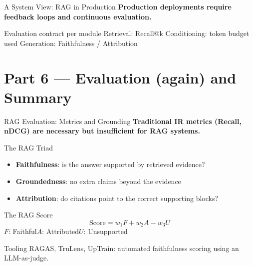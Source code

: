 \documentclass[aspectratio=169, xcolor=table]{beamer}
\newif\ifanimated
\newcommand{\cpause}{\ifanimated\pause\fi}
\begin{document}
\begin{frame}{A System View: RAG in Production}
\textbf{Production deployments require feedback loops and continuous evaluation.}

\vspace{0.5em}
\begin{center}
\resizebox{0.82\textwidth}{!}{

}
\end{center}

\cpause
\vspace{0.3em}
\begin{block}{Evaluation contract per module}
\footnotesize
Retrieval: Recall@k \quad\textbar\quad Conditioning: token budget used \quad\textbar\quad Generation: Faithfulness / Attribution
\end{block}
\end{frame}

\section{Part 6 --- Evaluation (again) and Summary}

\begin{frame}[plain]
\sectionpage
\end{frame}

\begin{frame}[shrink=10]{RAG Evaluation: Metrics and Grounding}
\textbf{Traditional IR metrics (Recall, nDCG) are necessary but insufficient for RAG systems.}

\vspace{0.8em}
\begin{block}{The RAG Triad}
\begin{itemize}
  \item \textbf{Faithfulness}: is the answer supported by retrieved evidence?
  \item \textbf{Groundedness}: no extra claims beyond the evidence
  \item \textbf{Attribution}: do citations point to the correct supporting blocks?
\end{itemize}
\end{block}

\cpause
\begin{block}{The RAG Score}
\[ \text{Score} = w_1 F + w_2 A - w_3 U \]
\tiny $F$: Faithful\quad $A$: Attributed\quad $U$: Unsupported
\end{block}

\cpause
\begin{block}{Tooling}
\footnotesize
RAGAS, TruLens, UpTrain: automated faithfulness scoring using an LLM-as-judge.
\end{block}
\end{frame}
\end{document}
